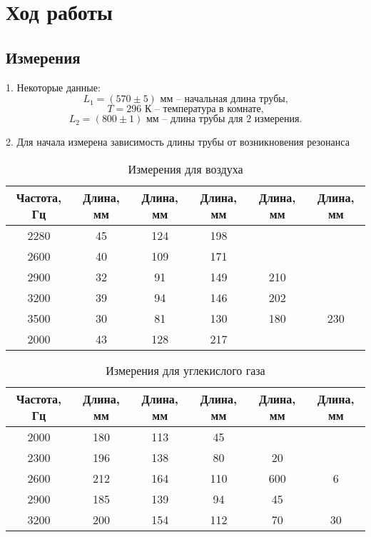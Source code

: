 \section{Ход работы}
\subsection{Измерения}

1. Некоторые данные:
\[L_1 = (570 \pm 5) \text{ мм -- начальная длина трубы,}\]
\[T = 296 \text{ К -- температура в комнате,}\]
\[L_2 = (800 \pm 1) \text{ мм -- длина трубы для 2 измерения.}\]

2. Для начала измерена зависимость длины трубы от возникновения резонанса
\begin{table}[h]
    \centering
    \begin{tabular}{|c|c|c|c|c|c|}
    \hline
    Частота, Гц & Длина, мм & Длина, мм & Длина, мм & Длина, мм & Длина, мм \\
    \hline
    2280 & 45 & 124 & 198 &&\\
    \hline
    2600 & 40 & 109 & 171 &&\\
    \hline
    2900 & 32 & 91 & 149 & 210 &\\
    \hline
    3200 & 39 & 94 & 146 & 202 &\\
    \hline
    3500 & 30 & 81 & 130 & 180 & 230 \\
    \hline
    2000 & 43 & 128 & 217 &&\\
    \hline
    \end{tabular}
    \caption{Измерения для воздуха}
\end{table}

\begin{table}[h]
    \centering
    \begin{tabular}{|c|c|c|c|c|c|}
    \hline
    Частота, Гц & Длина, мм & Длина, мм & Длина, мм & Длина, мм & Длина, мм \\
    \hline
    2000 & 180 & 113 & 45 &&\\
    \hline
    2300 & 196 & 138 & 80 & 20 &\\
    \hline
    2600 & 212 & 164 & 110 & 600 & 6 \\
    \hline
    2900 & 185 & 139 & 94 & 45 &\\
    \hline
    3200 & 200 & 154 & 112 & 70 & 30 \\
    \hline
    \end{tabular}
    \caption{Измерения для углекислого газа}
\end{table}

